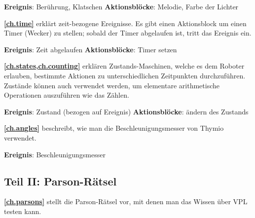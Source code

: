 \textbf{Ereignis}: Berührung, Klatschen \hfill \textbf{Aktionsblöcke}: Melodie, Farbe der Lichter

 \quad {} \hfill {}
\quad {} \quad {}

\medskip


\medskip

\textbf{\cref{ch.time}} erklärt zeit-bezogene Ereignisse. Es gibt einen Aktionsblock um einen Timer (Wecker) zu stellen; sobald der Timer abgelaufen ist, tritt das Ereignis ein. 

\textbf{Ereignis}: Zeit abgelaufen \hfill \textbf{Aktionsblöcke}: Timer setzen

 \hfill {}

\newpage

\textbf{\cref{ch.states,ch.counting}} erklären Zustands-Maschinen, welche es dem Roboter erlauben, bestimmte Aktionen zu unterschiedlichen Zeitpunkten durchzuführen. Zustände können auch verwendet werden, um elementare arithmetische Operationen auszuführen wie das Zählen.

\textbf{Ereignis}: Zustand (bezogen auf Ereignis) \hfill \textbf{Aktionsblöcke}:
ändern des Zustands

 \hfill {}

\medskip

\textbf{\cref{ch.angles}} beschreibt, wie man die Beschleunigungsmesser von Thymio verwendet.

\textbf{Ereignis}: Beschleunigungsmesser

 \quad {}

\bigskip

\subsection*{Teil II: Parson-Rätsel}

\textbf{\cref{ch.parsons}} stellt die Parson-Rätsel vor, mit denen man das Wissen über VPL testen kann.

